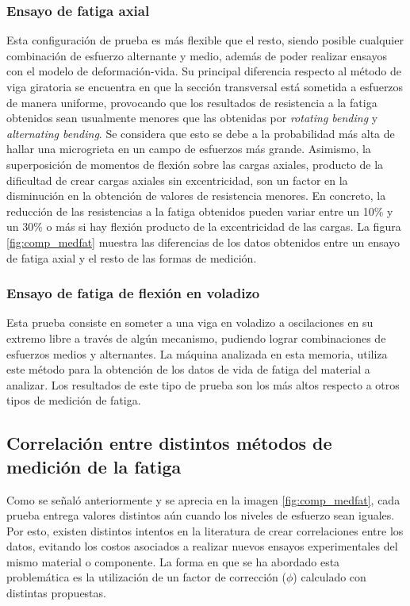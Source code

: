 \subsubsection{Ensayo de fatiga axial}
Esta configuración de prueba es más flexible que el resto, siendo posible cualquier combinación de esfuerzo alternante y medio, además de poder realizar ensayos con el modelo de deformación-vida. Su principal diferencia respecto al método de viga giratoria se encuentra en que la sección transversal está sometida a esfuerzos de manera uniforme, provocando que los resultados de resistencia a la fatiga obtenidos sean usualmente menores que las obtenidas por \textit{rotating bending} y \textit{alternating bending}. Se considera que esto se debe a la  probabilidad más alta de hallar una microgrieta en un campo de esfuerzos más grande. Asimismo, la superposición de momentos de flexión sobre las cargas axiales, producto de la dificultad de crear cargas axiales sin excentricidad, son un factor en la disminución en la obtención de valores de resistencia menores. En concreto, la reducción de las resistencias a la fatiga obtenidos pueden variar entre un 10$\%$ y un 30$\%$ o más si hay flexión producto de la excentricidad de las cargas. La figura \ref{fig:comp_medfat} muestra las diferencias de los datos obtenidos entre un ensayo de fatiga axial y el resto de las formas de medición.

\subsubsection{Ensayo de fatiga de flexión en voladizo}
Esta prueba consiste en someter a una viga en voladizo a oscilaciones en su extremo libre a través de algún mecanismo, pudiendo lograr combinaciones de esfuerzos medios y alternantes. La máquina analizada en esta memoria, utiliza este método para la obtención de los datos de vida de fatiga del material a analizar. Los resultados de este tipo de prueba son los más altos respecto a otros tipos de medición de fatiga.

\newpage

\subsection{Correlación entre distintos métodos de medición de la fatiga}
Como se señaló anteriormente y se aprecia en la imagen \ref{fig:comp_medfat}, cada prueba entrega valores distintos aún cuando los niveles de esfuerzo sean iguales. Por esto, existen distintos intentos en la literatura de crear correlaciones entre los datos, evitando los costos asociados a realizar nuevos ensayos experimentales del mismo material o componente. La forma en que se ha abordado esta problemática es la utilización de un factor de corrección ($\phi$) calculado con distintas propuestas.

